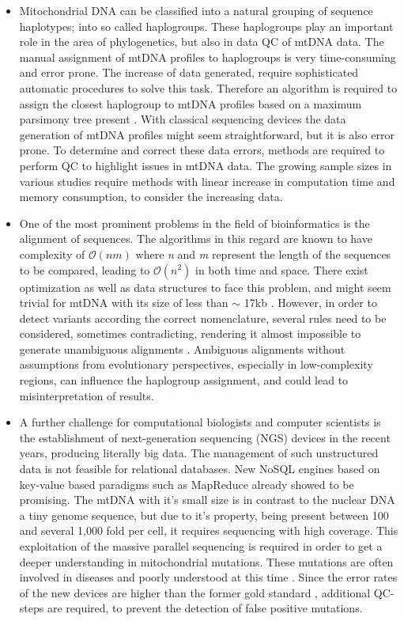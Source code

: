 \begin{itemize}
\item 
Mitochondrial DNA can be classified into a natural grouping of sequence haplotypes; into so called haplogroups. These haplogroups play an important role in the area of phylogenetics, but also in data QC of mtDNA data. The manual assignment of mtDNA profiles to haplogroups is very time-consuming and error prone. The increase of data generated, require sophisticated automatic procedures to solve this task. Therefore an algorithm is required to assign the closest haplogroup to mtDNA profiles based on a maximum parsimony tree present \cite{VanOven2009}. With classical sequencing devices the data generation of mtDNA profiles might seem straightforward, but it is also error prone. To determine and correct these data errors, methods are required to perform QC to highlight issues in mtDNA data. The growing sample sizes in various studies require methods with linear increase in computation time and memory consumption, to consider the increasing data. 
\item 
One of the most prominent problems in the field of bioinformatics is the alignment of sequences. The algorithms in this regard are known to have complexity of $\mathcal O(nm)$ where \textit{n} and \textit{m} represent the length of the sequences to be compared, leading to $\mathcal O(n^2)$ in both time and space. There exist optimization as well as data structures to face this problem, and might seem trivial for mtDNA with its size of less than $\sim$ 17kb \cite{Andrews1999}. However, in order to detect variants according the correct nomenclature, several rules need to be considered, sometimes contradicting, rendering it almost impossible to generate unambiguous alignments \cite{Bandelt2008}. Ambiguous alignments without assumptions from evolutionary perspectives, especially in low-complexity regions, can influence the haplogroup assignment, and could lead to misinterpretation of results.  
\item 
A further challenge for computational biologists and computer scientists is the establishment of next-generation sequencing (NGS) devices in the recent years, producing literally big data. The management of such unstructured data is not feasible for relational databases. New NoSQL engines based on key-value based paradigms such as MapReduce \cite{Dean2008} already showed to be promising\cite{Schonherr2012}. The mtDNA with it's small size is in contrast to the nuclear DNA a tiny genome sequence, but due to it's property, being present between 100 and several 1,000 fold per cell, it requires sequencing with high coverage. This exploitation of the massive parallel sequencing is required in order to get a deeper understanding in mitochondrial mutations. These mutations are often involved in diseases and poorly understood at this time \cite{Wallace2013}. Since the error rates of the new devices are higher than the former gold standard \cite{Wang2011}, additional QC-steps are required, to prevent the detection of false positive mutations. 

\end{itemize}

